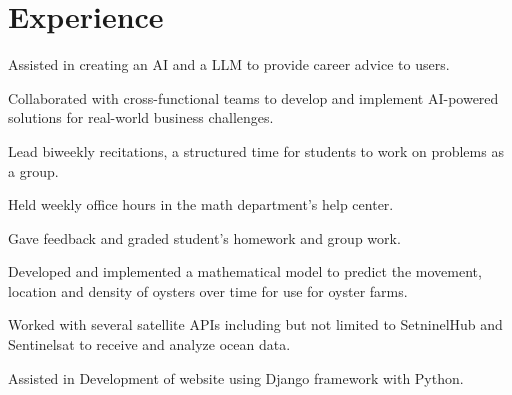 \documentclass[letterpaper]{deedy-resume} %
\begin{document}
\begin{minipage}[t]{0.66\textwidth} %


\section{Experience}


        \vspace{\topsep} %
        \begin{tightitemize}
            \item Assisted in creating an AI and a LLM to provide career advice to users.
            \item Collaborated with cross-functional teams to develop and implement AI-powered solutions for real-world business challenges.
        \end{tightitemize}

        \sectionspace %



        \begin{tightitemize}
            \item Lead biweekly recitations, a structured time for students to work on problems as a group.
            \item Held weekly office hours in the math department's help center.
            \item Gave feedback and graded student's homework and group work.
        \end{tightitemize}

        \sectionspace %



        \begin{tightitemize}
            \item Developed and implemented a mathematical model to predict the movement, location and density of oysters over time for use for oyster farms.
            \item Worked with several satellite APIs including but not limited to SetninelHub and Sentinelsat to receive and analyze ocean data.
            \item Assisted in Development of website using Django framework with Python.
        \end{tightitemize}


\end{minipage}
\end{document}
